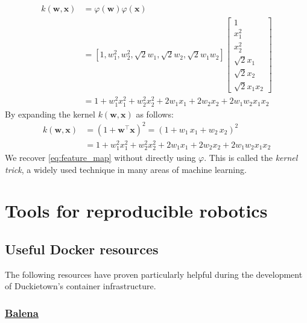 \begin{align}\label{eq:feature_map}
    k(\mathbf w, \mathbf x) &= \varphi(\mathbf w) \varphi(\mathbf x) \\
    &=[1, w_1^2, w_2^2, \sqrt{2} w_1, \sqrt{2} w_2, \sqrt{2} w_1 w_2]\begin{bmatrix}
                                                                                   1\\ x_1^2\\ x_2^2\\ \sqrt{2} x_1\\ \sqrt{2} x_2\\ \sqrt{2} x_1 x_2
    \end{bmatrix}\\
    & = \boxed{1 + w_1^2 x_1^2 + w_2^2 x_2^2 + 2 w_1 x_1 + 2 w_2 x_2 + 2 w_1 w_2 x_1 x_2}
\end{align}
%
By expanding the kernel $k(\mathbf w, \mathbf x)$ as follows:
%
\begin{align}
k(\mathbf w, \mathbf x) & = (1 + \mathbf w^\intercal \mathbf x)^2 = (1 + w_1 \, x_1 + w_2 \, x_2)^2 \\
& = \boxed{1 + w_1^2 x_1^2 + w_2^2 x_2^2 + 2 w_1 x_1 + 2 w_2 x_2 + 2 w_1 w_2 x_1 x_2}
\end{align}
%
We recover \autoref{eq:feature_map} without directly using $\varphi$. This is called the \textit{kernel trick}, a widely used technique in many areas of machine learning.

\chapter{Tools for reproducible robotics}

\section{Useful Docker resources}

The following resources have proven particularly helpful during the development of Duckietown's container infrastructure.

\subsection{\href{https://www.balena.io/}{Balena}}\label{subsec:balena}


